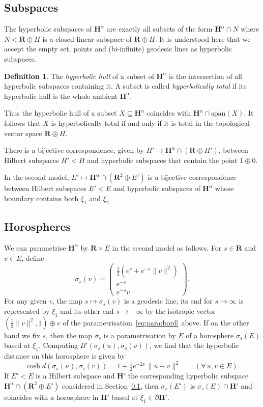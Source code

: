 \documentclass[11pt]{article}
\theoremstyle{definition}
\newtheorem{defi}[theo]{Definition}
\numberwithin{equation}{section}
\numberwithin{figure}{section}
\numberwithin{table}{section}
\newcommand{\sH}{H}
\newcommand{\RR}{\mathbf{R}}
\newcommand{\HH}{\mathbf{H}}
\newcommand{\se}{\subseteq}
\let\oldforall\forall
\renewcommand*{\forall}{\mathrel{\oldforall}}
\begin{document}
\subsection{Subspaces}\label{sec:subspace}

The hyperbolic subspaces of $\HH^\alpha$ are exactly all subsets of the form $\HH^\alpha \cap N$ where $N<\RR\oplus \sH$ is a closed linear subspace of $\RR\oplus\sH$. It is understood here that we accept the empty set, points and (bi-infinite) geodesic lines as hyperbolic subspaces.

\begin{defi}
The \emph{hyperbolic hull} of a subset of $\HH^\alpha$ is the intersection of all hyperbolic subspaces containing it. A subset is called \emph{hyperbolically total} if its hyperbolic hull is the whole ambient $\HH^\alpha$.
\end{defi}

Thus the hyperbolic hull of a subset $X\se \HH^\alpha$ coincides with $\HH^\alpha\cap\overline{\mathrm{span}}(X)$. It follows that $X$ is hyperbolically total if and only if it is total in the topological vector space $\RR\oplus \sH$.


There is a bijective correspondence, given by $\sH'\mapsto \HH^\alpha \cap (\RR\oplus \sH')$, between Hilbert subspaces $\sH'< \sH$ and hyperbolic subspaces that contain the point $1\oplus 0$.

In the second model, $E'\mapsto \HH^\alpha \cap (\RR^2\oplus E')$ is a bijective correspondence between Hilbert subspaces $E'<E$ and hyperbolic subspaces of $\HH^\alpha$ whose boundary contains both $\xi_1$ and $\xi_2$.

\subsection{Horospheres}\label{sec:horo}

We can parametrise $\HH^\alpha$ by $\RR\times E$ in the second model as follows. For $s\in \RR$ and $v\in E$, define
\[
\sigma_s(v) =
\begin{pmatrix}
\frac 12 (e^s + e^{-s} \|v\|^2)\\
e^{-s}\\
e^{-s} v
\end{pmatrix}.
\]
For any given $v$, the map $s\mapsto \sigma_s(v)$ is a geodesic line; its end for $s\to\infty$ is represented by $\xi_1$ and its other end $s\to-\infty$ by the isotropic vector $(\frac12 \|v\|^2,1)\oplus v$ of the parametrisation~\eqref{eq:para:bord} above. If on the other hand we fix $s$, then the map $\sigma_s$ is a parametrisation by $E$ of a horosphere $\sigma_s(E)$ based at $\xi_1$. Computing $B'(\sigma_s(u),\sigma_s(v))$, we find that the hyperbolic distance on this horosphere is given by
\begin{equation}\label{eq:horo:CNT}
\cosh d(\sigma_s(u),\sigma_s(v)) = 1 + \tfrac 12 e^{-2 s}\, \|u-v\|^2 \qquad(\forall\,u,v\in E).
\end{equation}
If $E'<E$ is a Hilbert subspace and $\HH'$ the corresponding hyperbolic subspace $\HH^\alpha \cap (\RR^2\oplus E')$ considered in Section~\ref{sec:subspace}, then $\sigma_s(E')$ is $\sigma_s(E)\cap \HH'$ and coincides with a horosphere in $\HH'$ based at $\xi_1\in\partial\HH'$.
\end{document}

